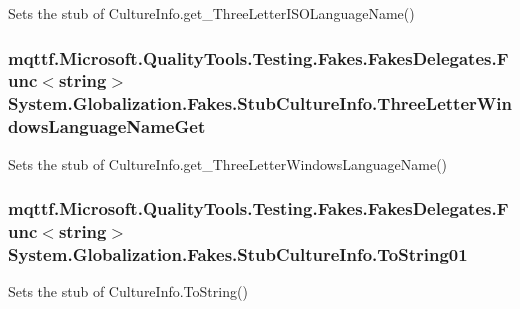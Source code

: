 Sets the stub of Culture\-Info.\-get\-\_\-\-Three\-Letter\-I\-S\-O\-Language\-Name()

\hypertarget{class_system_1_1_globalization_1_1_fakes_1_1_stub_culture_info_af449ba01a9b19ec4127118114e909290}{
\subsubsection[{Three\-Letter\-Windows\-Language\-Name\-Get}]{\setlength{\rightskip}{0pt plus 5cm}mqttf.\-Microsoft.\-Quality\-Tools.\-Testing.\-Fakes.\-Fakes\-Delegates.\-Func$<$string$>$ System.\-Globalization.\-Fakes.\-Stub\-Culture\-Info.\-Three\-Letter\-Windows\-Language\-Name\-Get}}\label{class_system_1_1_globalization_1_1_fakes_1_1_stub_culture_info_af449ba01a9b19ec4127118114e909290}


Sets the stub of Culture\-Info.\-get\-\_\-\-Three\-Letter\-Windows\-Language\-Name()

\hypertarget{class_system_1_1_globalization_1_1_fakes_1_1_stub_culture_info_a674f1775b9f91b129ea87daff624b282}{
\subsubsection[{To\-String01}]{\setlength{\rightskip}{0pt plus 5cm}mqttf.\-Microsoft.\-Quality\-Tools.\-Testing.\-Fakes.\-Fakes\-Delegates.\-Func$<$string$>$ System.\-Globalization.\-Fakes.\-Stub\-Culture\-Info.\-To\-String01}}\label{class_system_1_1_globalization_1_1_fakes_1_1_stub_culture_info_a674f1775b9f91b129ea87daff624b282}


Sets the stub of Culture\-Info.\-To\-String()

